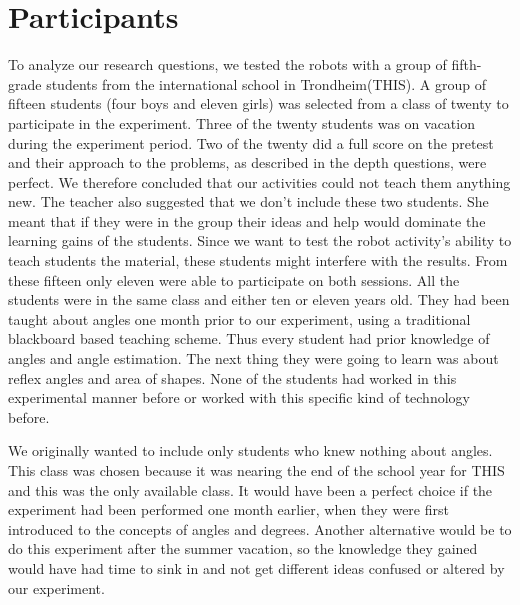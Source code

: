 \section{Participants}
To analyze our research questions, we tested the robots with a group of fifth-grade students from the international school in Trondheim(THIS). A group of fifteen students (four boys and eleven girls) was selected from a class of twenty to participate in the experiment. Three of the twenty students was on vacation during the experiment period. Two of the twenty did a full score on the pretest and their approach to the problems, as described in the depth questions, were perfect. We therefore concluded that our activities could not teach them anything new. The teacher also suggested that we don't include these two students. She meant that if they were in the group their ideas and help would dominate the learning gains of the students. Since we want to test the robot activity's ability to teach students the material, these students might interfere with the results. From these fifteen only eleven were able to participate on both sessions. 
All the students were in the same class and either ten or eleven years old. They had been taught about angles one month prior to our experiment, using a traditional blackboard based teaching scheme. Thus every student had prior knowledge of angles and angle estimation. The next thing they were going to learn was about reflex angles and area of shapes. None of the students had worked in this experimental manner before or worked with this specific kind of technology before.

\bigskip\noindent
We originally wanted to include only students who knew nothing about angles. This class was chosen because it was nearing the end of the school year for THIS and this was the only available class. It would have been a perfect choice if the experiment had been performed one month earlier, when they were first introduced to the concepts of angles and degrees. Another alternative would be to do this experiment after the summer vacation, so the knowledge they gained would have had time to sink in and not get different ideas confused or altered by our experiment. 